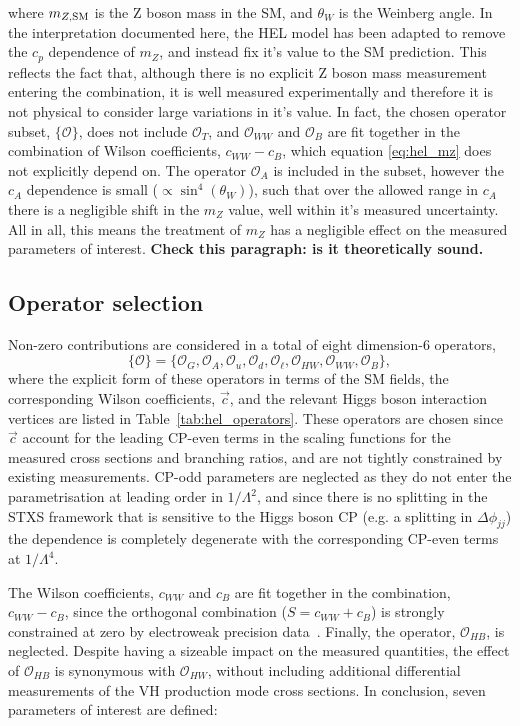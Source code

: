 \noindent
where $m_{Z,\rm{SM}}$ is the Z boson mass in the SM, and $\theta_W$ is the Weinberg angle. In the interpretation documented here, the HEL model has been adapted to remove the $c_p$ dependence of $m_Z$, and instead fix it's value to the SM prediction. This reflects the fact that, although there is no explicit Z boson mass measurement entering the combination, it is well measured experimentally and therefore it is not physical to consider large variations in it's value. In fact, the chosen operator subset, $\{\mathcal{O}\}$, does not include $\mathcal{O}_T$, and $\mathcal{O}_{WW}$ and $\mathcal{O}_B$ are fit together in the combination of Wilson coefficients, $c_{WW}-c_B$, which equation \ref{eq:hel_mz} does not explicitly depend on. The operator $\mathcal{O}_A$ is included in the subset, however the $c_A$ dependence is small ($\propto \sin^4(\theta_W)$), such that over the allowed range in $c_A$ there is a negligible shift in the $m_Z$ value, well within it's measured uncertainty. All in all, this means the treatment of $m_Z$ has a negligible effect on the measured parameters of interest. \textbf{Check this paragraph: is it theoretically sound.}

\subsection{Operator selection}\label{sec:eft_operator}
Non-zero contributions are considered in a total of eight dimension-6 operators,
\begin{equation}
    \{\mathcal{O}\} = \{\mathcal{O}_G,\mathcal{O}_A,\mathcal{O}_u,\mathcal{O}_d,\mathcal{O}_\ell,\mathcal{O}_{HW},\mathcal{O}_{WW},\mathcal{O}_B\},
\end{equation}
\noindent
where the explicit form of these operators in terms of the SM fields, the corresponding Wilson coefficients, $\vec{c}$, and the relevant Higgs boson interaction vertices are listed in Table~\ref{tab:hel_operators}. These operators are chosen since $\vec{c}$ account for the leading CP-even terms in the scaling functions for the measured cross sections and branching ratios, and are not tightly constrained by existing measurements. CP-odd parameters are neglected as they do not enter the parametrisation at leading order in $1/\Lambda^2$, and since there is no splitting in the STXS framework that is sensitive to the Higgs boson CP (e.g. a splitting in $\Delta\phi_{jj}$) the dependence is completely degenerate with the corresponding CP-even terms at $1/\Lambda^4$.

The Wilson coefficients, $c_{WW}$ and $c_B$ are fit together in the combination, $c_{WW}-c_B$, since the orthogonal combination ($S=c_{WW}+c_B$) is strongly constrained at zero by electroweak precision data~\cite{Ellis:2014jta}. Finally, the operator, $\mathcal{O}_{HB}$, is neglected. Despite having a sizeable impact on the measured quantities, the effect of $\mathcal{O}_{HB}$ is synonymous with $\mathcal{O}_{HW}$, without including additional differential measurements of the VH production mode cross sections. In conclusion, seven parameters of interest are defined:


